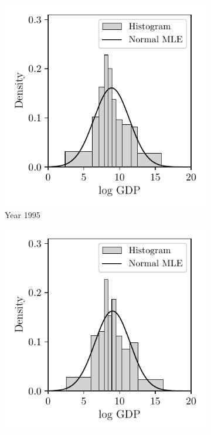 \begin{figure}[ht]
  \centering
  \begin{subfigure}{0.32\textwidth}
    \centering
    \includegraphics[scale=0.64]{graphics/trade_gdp_1995.pdf}
    \caption{Year 1995}
  \end{subfigure}
  \begin{subfigure}{0.32\textwidth}
    \centering
    \includegraphics[scale=0.64]{graphics/trade_gdp_2000.pdf}

\end{subfigure}
\end{figure}
